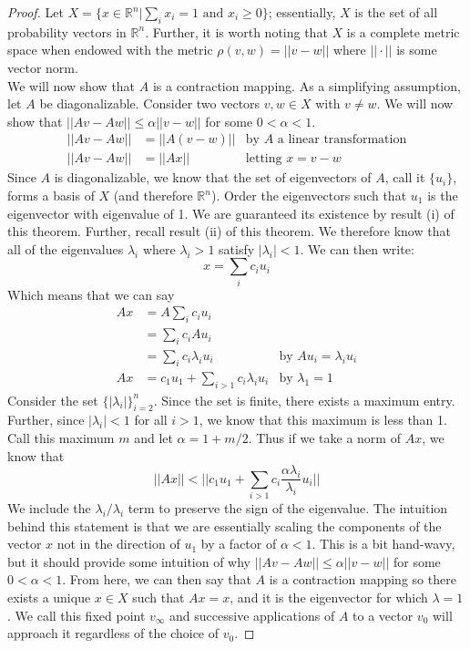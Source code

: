 \documentclass[10pt]{article}
\newcommand{\R}{\mathbb{R}}
\begin{document}
\begin{proof}
Let $X=\{x\in\R^n|\sum_i x_i = 1\text{ and } x_i\geq 0\}$; essentially, $X$ is the set of all probability vectors in $\R^n$. Further, it is worth noting that $X$ is a complete metric space when endowed with the metric $\rho(v,w)=||v-w||$ where $||\cdot||$ is some vector norm.\vspace{0.5cm}\\
We will now show that $A$ is a contraction mapping. As a simplifying assumption, let $A$ be diagonalizable. Consider two vectors $v,w\in X$ with $v\neq w$. We will now show that $||Av-Aw|| \leq \alpha ||v - w||$ for some $0<\alpha<1$.
\begin{align*}
    ||Av-Aw|| &= ||A(v-w)|| &\text{by $A$ a linear transformation}\\
    ||Av-Aw|| &= ||Ax|| &\text{letting }x=v-w
\end{align*}
Since $A$ is diagonalizable, we know that the set of eigenvectors of $A$, call it $\{u_i\}$, forms a basis of $X$ (and therefore $\R^n$). Order the eigenvectors such that $u_1$ is the eigenvector with eigenvalue of 1. We are guaranteed its existence by result (i) of this theorem. Further, recall result (ii) of this theorem. We therefore know that all of the eigenvalues $\lambda_i$ where $\lambda_i> 1$ satisfy $|\lambda_i|<1$. We can then write:
\[x = \sum_{i} c_i u_i\]
Which means that we can say
\begin{align*}
    Ax &= A \sum_{i} c_i u_i\\
    &= \sum_{i} c_i A u_i\\
    &= \sum_{i} c_i \lambda_i u_i &\text{by } Au_i = \lambda_i u_i\\
    Ax &= c_1 u_1 + \sum_{i>1} c_i \lambda_i u_i &\text{by }\lambda_1=1
\end{align*}
Consider the set $\{|\lambda_i|\}_{i=2}^n$. Since the set is finite, there exists a maximum entry. Further, since $|\lambda_i|<1$ for all $i>1$, we know that this maximum is less than 1. Call this maximum $m$ and let $\alpha=1+m/2$. Thus if we take a norm of $Ax$, we know that
\[||Ax|| < \Big|\Big| c_1 u_1 + \sum_{i>1} c_i \frac{\alpha \lambda_i}{\lambda_i} u_i\Big|\Big|\]
We include the $\lambda_i/\lambda_i$ term to preserve the sign of the eigenvalue. The intuition behind this statement is that we are essentially scaling the components of the vector $x$ not in the direction of $u_1$ by a factor of $\alpha<1$. This is a bit hand-wavy, but it should provide some intuition of why $||Av-Aw|| \leq \alpha ||v - w||$ for some $0<\alpha<1$. From here, we can then say that $A$ is a contraction mapping so there exists a unique $x\in X$ such that $Ax=x$, and it is the eigenvector for which $\lambda=1$. We call this fixed point $v_\infty$ and successive applications of $A$ to a vector $v_0$ will approach it regardless of the choice of $v_0$.
\end{proof}
\end{document}
